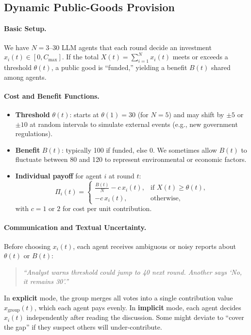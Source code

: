 \subsection{Dynamic Public-Goods Provision}
\label{appendix:publicgood}

\paragraph{Basic Setup.}
We have $N=3$--$30$ LLM agents that each round decide an investment $x_i(t) \in [0, C_{\max}]$. If the total $X(t) = \sum_{i=1}^N x_i(t)$ meets or exceeds a threshold $\theta(t)$, a public good is “funded,” yielding a benefit $B(t)$ shared among agents.

\paragraph{Cost and Benefit Functions.}
\begin{itemize}
    \item \textbf{Threshold} $\theta(t)$: starts at $\theta(1)=30$ (for $N=5$) and may shift by $\pm 5$ or $\pm 10$ at random intervals to simulate external events (e.g., new government regulations). 
    \item \textbf{Benefit} $B(t)$: typically 100 if funded, else 0. We sometimes allow $B(t)$ to fluctuate between 80 and 120 to represent environmental or economic factors.
    \item \textbf{Individual payoff} for agent $i$ at round $t$:
    \[
    \Pi_i(t) = \begin{cases}
    \tfrac{B(t)}{N} - c\, x_i(t), & \text{if } X(t) \ge \theta(t), \\
    -c\,x_i(t), & \text{otherwise},
    \end{cases}
    \]
    with $c=1$ or $2$ for cost per unit contribution. 
\end{itemize}

\paragraph{Communication and Textual Uncertainty.}
Before choosing $x_i(t)$, each agent receives ambiguous or noisy reports about $\theta(t)$ or $B(t)$:
\begin{quote}
\small
\emph{``Analyst warns threshold could jump to 40 next round. Another says \emph{`No, it remains 30'}.''}
\normalsize
\end{quote}
In \textbf{explicit} mode, the group merges all votes into a single contribution value $x_{\mathrm{group}}(t)$, which each agent pays evenly. In \textbf{implicit} mode, each agent decides $x_i(t)$ independently after reading the discussion. Some might deviate to “cover the gap” if they suspect others will under-contribute.

